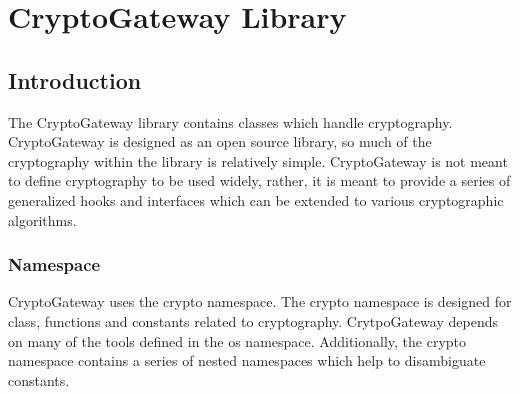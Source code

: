 \part{CryptoGateway Library} \label{sec:cryptogateway}

	\chapter{Introduction}

	The CryptoGateway library contains classes which handle cryptography.  CryptoGateway is designed as an open source library, so much of the cryptography within the library is relatively simple.  CryptoGateway is not meant to define cryptography to be used widely, rather, it is meant to provide a series of generalized hooks and interfaces which can be extended to various cryptographic algorithms.
		
		\section{Namespace} \label{sec:Namespace}
		CryptoGateway uses the crypto namespace.  The crypto namespace is designed for class, functions and constants related to cryptography.  CrytpoGateway depends on many of the tools defined in the os namespace.  Additionally, the crypto namespace contains a series of nested namespaces which help to disambiguate constants.

